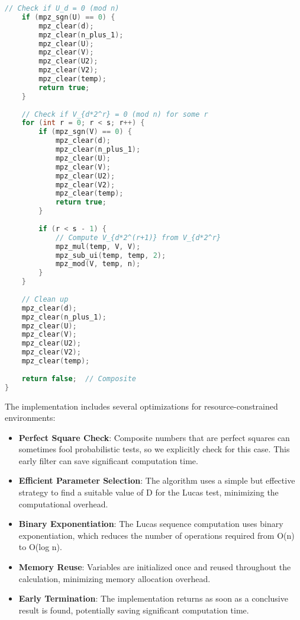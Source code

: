 \begin{lstlisting}[language=C++, caption=Strong Lucas Probable Prime Test]
    // Check if U_d = 0 (mod n)
    if (mpz_sgn(U) == 0) {
        mpz_clear(d);
        mpz_clear(n_plus_1);
        mpz_clear(U);
        mpz_clear(V);
        mpz_clear(U2);
        mpz_clear(V2);
        mpz_clear(temp);
        return true;
    }
    
    // Check if V_{d*2^r} = 0 (mod n) for some r
    for (int r = 0; r < s; r++) {
        if (mpz_sgn(V) == 0) {
            mpz_clear(d);
            mpz_clear(n_plus_1);
            mpz_clear(U);
            mpz_clear(V);
            mpz_clear(U2);
            mpz_clear(V2);
            mpz_clear(temp);
            return true;
        }
        
        if (r < s - 1) {
            // Compute V_{d*2^(r+1)} from V_{d*2^r}
            mpz_mul(temp, V, V);
            mpz_sub_ui(temp, temp, 2);
            mpz_mod(V, temp, n);
        }
    }
    
    // Clean up
    mpz_clear(d);
    mpz_clear(n_plus_1);
    mpz_clear(U);
    mpz_clear(V);
    mpz_clear(U2);
    mpz_clear(V2);
    mpz_clear(temp);
    
    return false;  // Composite
}
\end{lstlisting}

The implementation includes several optimizations for resource-constrained environments:

\begin{itemize}
    \item \textbf{Perfect Square Check}: Composite numbers that are perfect squares can sometimes fool probabilistic tests, so we explicitly check for this case. This early filter can save significant computation time.
    
    \item \textbf{Efficient Parameter Selection}: The algorithm uses a simple but effective strategy to find a suitable value of D for the Lucas test, minimizing the computational overhead.
    
    \item \textbf{Binary Exponentiation}: The Lucas sequence computation uses binary exponentiation, which reduces the number of operations required from O(n) to O(log n).
    
    \item \textbf{Memory Reuse}: Variables are initialized once and reused throughout the calculation, minimizing memory allocation overhead.
    
    \item \textbf{Early Termination}: The implementation returns as soon as a conclusive result is found, potentially saving significant computation time.
\end{itemize}


